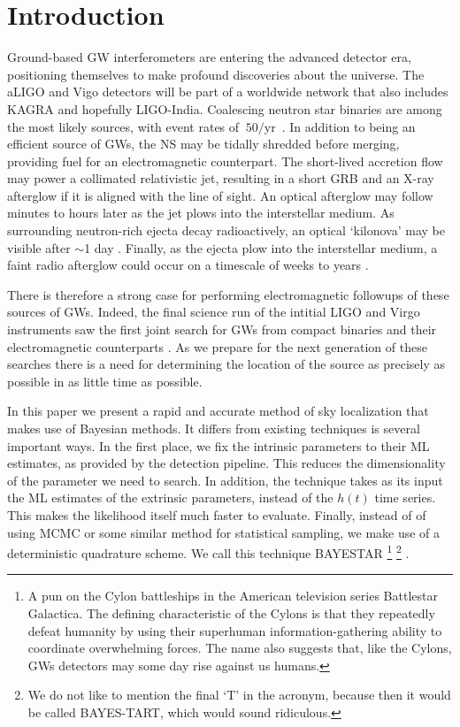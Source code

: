 \documentclass{iopart}
\let\oldmarginpar\marginpar
\renewcommand\marginpar[1]{\-\oldmarginpar[\raggedleft\footnotesize #1]%
{\raggedright\footnotesize #1}}
\begin{document}
\section{Introduction}

Ground-based \ac{GW} interferometers are entering the advanced detector era, positioning themselves to make profound discoveries about the universe. The \ac{aLIGO} and Vigo detectors will be part of a worldwide network that also includes KAGRA and hopefully LIGO-India. Coalescing neutron star binaries are among the most likely sources, with event rates of $~ 50/\mathrm{yr}$~\cite{rates}.%
%
\marginpar{Check that number.}
%
In addition to being an efficient source of \acp{GW}, the \ac{NS} may be tidally shredded before merging, providing fuel for an electromagnetic counterpart. The short-lived accretion flow may power a collimated relativistic jet, resulting in a short \ac{GRB} and an X-ray afterglow if it is aligned with the line of sight. An optical afterglow may follow minutes to hours later as the jet plows into the interstellar medium. As surrounding neutron-rich ejecta decay radioactively, an optical `kilonova' may be visible after $\sim$1 day \cite{metzger:2010}. Finally, as the ejecta plow into the interstellar medium, a faint radio afterglow could occur on a timescale of weeks to years \cite{Nakar:2011cw}.

There is therefore a strong case for performing electromagnetic followups of these sources of \acp{GW}. Indeed, the final science run of the intitial LIGO and Virgo instruments saw the first joint search for \acp{GW} from compact binaries and their electromagnetic counterparts \cite{abadie2012first}.  As we prepare for the next generation of these searches there is a need for determining the location of the source as precisely as possible in as little time as possible.

In this paper we present a rapid and accurate method of sky localization that makes use of Bayesian methods. It differs from existing techniques is several important ways.  In the first place, we fix the intrinsic parameters to their \ac{ML} estimates, as provided by the detection pipeline.  This reduces the dimensionality of the parameter we need to search. In addition, the technique takes as its input the \ac{ML} estimates of the extrinsic parameters, instead of the $h(t)$ time series. This makes the likelihood itself much faster to evaluate. Finally, instead of of using \ac{MCMC} or some similar method for statistical sampling, we make use of a deterministic quadrature scheme. We call this technique \ac{BAYESTAR}%
%
\footnote{A pun on the Cylon battleships in the American television series Battlestar Galactica. The defining characteristic of the Cylons is that they repeatedly defeat humanity by using their superhuman information\nobreakdashes-gathering ability to coordinate overwhelming forces. The name also suggests that, like the Cylons, \acp{GW} detectors may some day rise against us humans.}%
%
\footnote{We do not like to mention the final `T' in the acronym, because then it would be called BAYES\nobreakdashes-TART, which would sound ridiculous.}%
.
\end{document}
